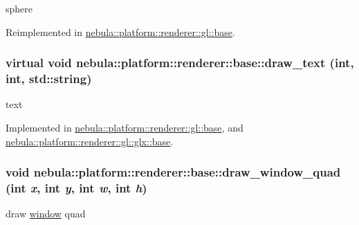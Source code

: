 sphere 

Reimplemented in \hyperlink{classnebula_1_1platform_1_1renderer_1_1gl_1_1base_a0c7b5d23095d7efe88dbfa57f2010b4a}{nebula::platform::renderer::gl::base}.\hypertarget{classnebula_1_1platform_1_1renderer_1_1base_afee2147d5f479f6c859c600fc224012c}{
\subsubsection[{draw\_\-text}]{\setlength{\rightskip}{0pt plus 5cm}virtual void nebula::platform::renderer::base::draw\_\-text (int, \/  int, \/  std::string)}}
\label{classnebula_1_1platform_1_1renderer_1_1base_afee2147d5f479f6c859c600fc224012c}


text 

Implemented in \hyperlink{classnebula_1_1platform_1_1renderer_1_1gl_1_1base_af810a42a4c3731488253ee268352f456}{nebula::platform::renderer::gl::base}, and \hyperlink{classnebula_1_1platform_1_1renderer_1_1gl_1_1glx_1_1base_a3bed53ee587076a42419e5323ffd4b13}{nebula::platform::renderer::gl::glx::base}.\hypertarget{classnebula_1_1platform_1_1renderer_1_1base_a53de4e109fe24d7254aa1b5864cbe283}{
\subsubsection[{draw\_\-window\_\-quad}]{\setlength{\rightskip}{0pt plus 5cm}void nebula::platform::renderer::base::draw\_\-window\_\-quad (int {\em x}, \/  int {\em y}, \/  int {\em w}, \/  int {\em h})}}
\label{classnebula_1_1platform_1_1renderer_1_1base_a53de4e109fe24d7254aa1b5864cbe283}


draw \hyperlink{namespacenebula_1_1platform_1_1window}{window} quad 

